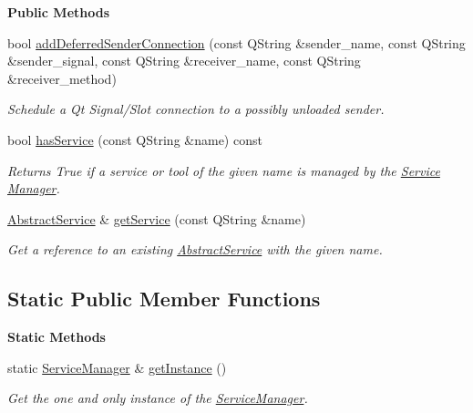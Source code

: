 \begin{Indent}\textbf{ Public Methods}\par
\begin{DoxyCompactItemize}
\item 
bool \mbox{\hyperlink{classrev_1_1_service_manager_af74579fd1a460c2caf521f9363f03ab1}{add\+Deferred\+Sender\+Connection}} (const Q\+String \&sender\+\_\+name, const Q\+String \&sender\+\_\+signal, const Q\+String \&receiver\+\_\+name, const Q\+String \&receiver\+\_\+method)
\begin{DoxyCompactList}\small\item\em Schedule a Qt Signal/\+Slot connection to a possibly unloaded sender. \end{DoxyCompactList}\item 
bool \mbox{\hyperlink{classrev_1_1_service_manager_a0c881de30ce94451c102e41b456ea8c7}{has\+Service}} (const Q\+String \&name) const
\begin{DoxyCompactList}\small\item\em Returns True if a service or tool of the given name is managed by the \mbox{\hyperlink{classrev_1_1_service}{Service}} \mbox{\hyperlink{classrev_1_1_manager}{Manager}}. \end{DoxyCompactList}\item 
\mbox{\hyperlink{classrev_1_1_abstract_service}{Abstract\+Service}} \& \mbox{\hyperlink{classrev_1_1_service_manager_a88bf7de4e527f12bd2df851b7867b433}{get\+Service}} (const Q\+String \&name)
\begin{DoxyCompactList}\small\item\em Get a reference to an existing \mbox{\hyperlink{classrev_1_1_abstract_service}{Abstract\+Service}} with the given name. \end{DoxyCompactList}\end{DoxyCompactItemize}
\end{Indent}
\subsection*{Static Public Member Functions}
\begin{Indent}\textbf{ Static Methods}\par
\begin{DoxyCompactItemize}
\item 
static \mbox{\hyperlink{classrev_1_1_service_manager}{Service\+Manager}} \& \mbox{\hyperlink{classrev_1_1_service_manager_acb0c624f49261719e00e9ae99b383548}{get\+Instance}} ()
\begin{DoxyCompactList}\small\item\em Get the one and only instance of the \mbox{\hyperlink{classrev_1_1_service_manager}{Service\+Manager}}. \end{DoxyCompactList}\end{DoxyCompactItemize}
\end{Indent}
